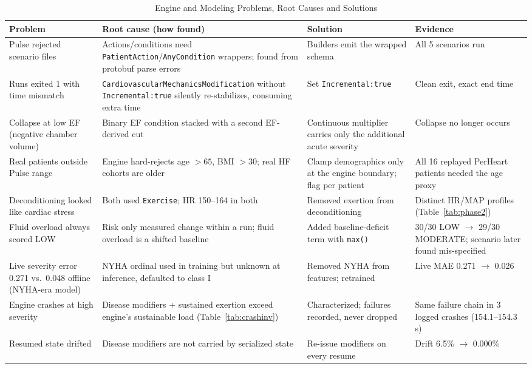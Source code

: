 \documentclass[conference]{IEEEtran}
\newcommand{\code}[1]{\texttt{\footnotesize #1}}
\begin{document}
\begin{table}[!t]
\centering
\caption{Engine and Modeling Problems, Root Causes and Solutions}
\label{tab:problems}
\footnotesize\sloppy
\begin{tabularx}{\textwidth}{@{}P{3.1cm}YYP{2.6cm}@{}}
\toprule
\textbf{Problem} & \textbf{Root cause (how found)} & \textbf{Solution} & \textbf{Evidence} \\
\midrule
Pulse rejected scenario files & Actions/conditions need \code{PatientAction}/\code{AnyCondition} wrappers; found from protobuf parse errors & Builders emit the wrapped schema & All 5 scenarios run \\
Runs exited 1 with time mismatch & \code{CardiovascularMechanicsModification} without \code{Incremental:true} silently re-stabilizes, consuming extra time & Set \code{Incremental:true} & Clean exit, exact end time \\
Collapse at low EF (negative chamber volume) & Binary EF condition stacked with a second EF-derived cut & Continuous multiplier carries only the additional acute severity & Collapse no longer occurs \\
Real patients outside Pulse range & Engine hard-rejects age $>65$, BMI $>30$; real HF cohorts are older & Clamp demographics only at the engine boundary; flag per patient & All 16 replayed PerHeart patients needed the age proxy \\
Deconditioning looked like cardiac stress & Both used \code{Exercise}; HR 150--164 in both & Removed exertion from deconditioning & Distinct HR/MAP profiles (Table~\ref{tab:phase2}) \\
Fluid overload always scored LOW & Risk only measured change within a run; fluid overload is a shifted baseline & Added baseline-deficit term with \code{max()} & 30/30 LOW $\rightarrow$ 29/30 MODERATE; scenario later found mis-specified \\
Live severity error 0.271 vs.\ 0.048 offline (NYHA-era model) & NYHA ordinal used in training but unknown at inference, defaulted to class I & Removed NYHA from features; retrained & Live MAE 0.271 $\rightarrow$ 0.026 \\
Engine crashes at high severity & Disease modifiers + sustained exertion exceed engine's sustainable load (Table~\ref{tab:crashinv}) & Characterized; failures recorded, never dropped & Same failure chain in 3 logged crashes (154.1--154.3\,s) \\
Resumed state drifted & Disease modifiers are not carried by serialized state & Re-issue modifiers on every resume & Drift 6.5\% $\rightarrow$ 0.000\% \\

\end{tabularx}
\end{table}
\end{document}
